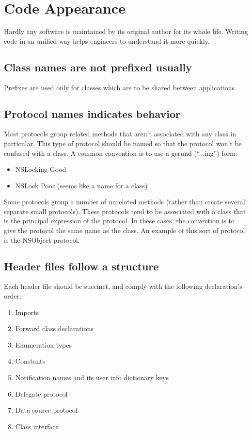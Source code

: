 \documentclass[10pt]{extarticle}
\begin{document}
\tableofcontents

\section{Code Appearance}


Hardly any software is maintained by its original author for its whole life. Writing code in an unified way helps engineers to understand it more quickly.


\subsection{Class names are not prefixed usually}

Prefixes are used only for classes which are to be shared between applications.


\subsection{Protocol names indicates behavior}
Most protocols group related methods that aren’t associated with any class in particular. This type of protocol should be named so that the protocol won’t be confused with a class. A common convention is to use a gerund (“...ing”) form:

\begin{itemize}
\item NSLocking	\tabto{3cm} Good
\item NSLock \tabto{3cm} Poor (seems like a name for a class)
\end{itemize}

Some protocols group a number of unrelated methods (rather than create several separate small protocols). These protocols tend to be associated with a class that is the principal expression of the protocol. In these cases, the convention is to give the protocol the same name as the class. An example of this sort of protocol is the NSObject protocol.


\subsection{Header files follow a structure}

Each header file should be succinct, and comply with the following declaration's order:

\begin{enumerate}
\item Imports
\item Forward class declarations
\item Enumeration types
\item Constants
\item Notification names and its user info dictionary keys
\item Delegate protocol
\item Data source protocol
\item Class interface
\end{enumerate}
\end{document}
